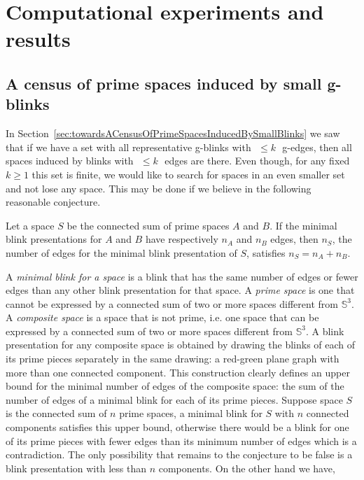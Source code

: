 \section{Computational experiments and results}
\label{chap:census}

\subsection{A census of prime spaces induced by small g-blinks}
\label{sec:census}

\newcommand{\kpu}{\,$k$-prime-unavoidable }
\newcommand{\npu}[1]{\,$#1$-prime-unavoidable }
\newcommand{\Rk}{{\cal R}_k }
\newcommand{\Rkl}{{\cal R}'_k}

In Section~\ref{sec:towardsACensusOfPrimeSpacesInducedBySmallBlinks}
we saw that if we have a set with all representative g-blinks with
$\,\,\leq k \,\,$ g-edges, then all spaces induced by blinks with
$\,\,\leq k \,\,$ edges are there. Even though, for any fixed $k \geq
1$ this set is finite, we would like to search for spaces in an
even smaller set and not lose any space. This may be done if we
believe in the following reasonable conjecture.

\begin{conjecture} \label{conj:noCompositeHasFewerEdgesThanItsMinimalPrimeSum}
Let a space $S$ be the connected sum of prime spaces $A$ and $B$.
If the minimal blink presentations for $A$ and $B$ have respectively $n_A$ and
$n_B$ edges, then $n_S$, the number of edges for the minimal blink presentation
of $S$, satisfies  $n_S = n_A + n_B$.
\end{conjecture}

A {\em minimal blink for a space} is a blink that
has the same number of edges or fewer edges than any other blink
presentation for that space. A {\em prime space} is one that cannot
be expressed by a connected sum of two or more spaces
different from $\mathbb{S}^3$. A {\em composite space} is a space
that is not prime, i.e. one space that can be expressed by a connected sum of
two or more spaces different from $\mathbb{S}^3$. A blink presentation for any composite space
is obtained by drawing the blinks of each of its prime pieces
separately in the same drawing: a red-green plane graph with more than one
connected component. This construction clearly defines an upper bound for
the minimal number of edges of the composite space: the sum of
the number of edges of a minimal blink for each of its
prime pieces. Suppose space $S$ is the connected sum of $n$ prime
spaces, a minimal blink for $S$ with $n$ connected
components satisfies this upper bound, otherwise there would be
a blink for one of its prime pieces with fewer edges than its minimum
number of edges which is a contradiction. The only
possibility that remains to the conjecture to be false is
a blink presentation with less than $n$ components. On the other
hand we have,

